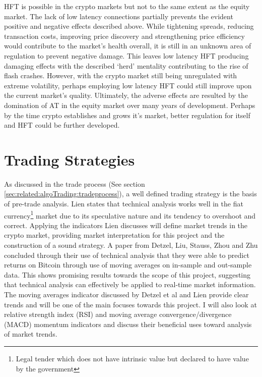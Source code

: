 HFT is possible in the crypto markets but not to the same extent as the equity market. The lack of low latency connections partially prevents the evident positive and negative effects described above. While tightening spreads, reducing transaction costs, improving price discovery and strengthening price efficiency would contribute to the market's health overall, it is still in an unknown area of regulation to prevent negative damage. This leaves low latency HFT producing damaging effects with the described `herd' mentality contributing to the rise of flash crashes.  However, with the crypto market still being unregulated with extreme volatility, perhaps employing low latency HFT could still improve upon the current market's quality. Ultimately, the adverse effects are resulted by the domination of AT in the equity market over many years of development. Perhaps by the time crypto establishes and grows it's market, better regulation for itself and HFT could be further developed.



\section{Trading Strategies}
\label{sec:related:tradingStrategies}
\noindent As discussed in the trade process (See section \ref{sec:related:algoTrading:tradeprocess}), a well defined trading strategy is the basis of pre-trade analysis. Lien \cite{BOOK:Lien:2016} states that technical analysis works well in the fiat currency\footnote{Legal tender which does not have intrinsic value but declared to have value by the government} market due to its speculative nature and its tendency to overshoot and correct. Applying the indicators Lien discusses will define market trends in the crypto market, providing market interpretation for this project and the construction of a sound strategy. A paper from Detzel, Liu, Stauss, Zhou and Zhu \cite{ART:DetzelEtAl:2018} concluded through their use of technical analysis that they were able to predict returns on Bitcoin through use of moving averages on in-sample and out-sample data. This shows promising results towards the scope of this project, suggesting that technical analysis can effectively be applied to real-time market information. The moving averages indicator discussed by Detzel et al \cite{ART:DetzelEtAl:2018} and Lien \cite{BOOK:Lien:2016} provide clear trends and will be one of the main focuses towards this project. I will also look at relative strength index (RSI) and moving average convergence/divergence (MACD) momentum indicators and discuss their beneficial uses toward analysis of market trends.

